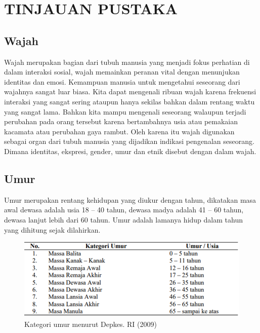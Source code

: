 \section{TINJAUAN PUSTAKA}

\subsection{Wajah}


Wajah merupakan bagian dari tubuh manusia yang menjadi fokus perhatian di dalam interaksi sosial, 
wajah memainkan peranan vital dengan menunjukan identitas dan emosi. Kemampuan manusia untuk mengetahui 
seseorang dari wajahnya sangat luar biasa. Kita dapat mengenali ribuan wajah karena frekuensi interaksi 
yang sangat sering ataupun hanya sekilas bahkan dalam rentang waktu yang sangat lama. Bahkan kita mampu 
mengenali seseorang walaupun terjadi perubahan pada orang tersebut karena bertambahnya usia atau 
pemakaian kacamata atau perubahan gaya rambut. Oleh karena itu wajah digunakan sebagai organ dari tubuh 
manusia yang dijadikan indikasi pengenalan seseorang. Dimana identitas, ekspresi, gender, umur dan etnik 
disebut dengan dalam wajah.

\subsection{Umur}
Umur merupakan rentang kehidupan yang diukur dengan tahun, dikatakan masa awal dewasa adalah usia 18 – 40 
tahun, dewasa madya adalah 41 – 60 tahun, dewasa lanjut lebih dari 60 tahun. Umur adalah lamanya hidup 
dalam tahun yang dihitung sejak dilahirkan\citep{MasaTubuh}.
\begin{figure} [H] \centering
    \includegraphics[scale=0.6]{gambar/umur.png}
    \caption{Kategori umur menurut Depkes. RI (2009)}
    \label{fig:Umur}
\end{figure}

